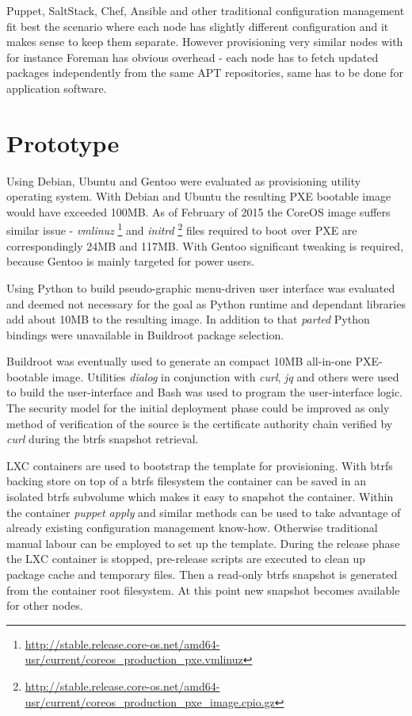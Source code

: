 \documentclass{article}
\begin{document}
Puppet, SaltStack, Chef, Ansible and other traditional configuration management
fit best the scenario where each node has slightly different configuration and
it makes sense to keep them separate. However provisioning very similar nodes
with for instance Foreman has obvious overhead - each node has to fetch updated
packages independently from the same APT repositories, same has to be done for
application software.

\section{Prototype}

Using Debian, Ubuntu and Gentoo were evaluated as provisioning utility
operating system. With Debian and Ubuntu the resulting PXE bootable image
would have exceeded 100MB.
As of February of 2015 the CoreOS image suffers similar issue -
\emph{vmlinuz}
\footnote{\url{http://stable.release.core-os.net/amd64-usr/current/coreos_production_pxe.vmlinuz}}
and
\emph{initrd}
\footnote{\url{http://stable.release.core-os.net/amd64-usr/current/coreos_production_pxe_image.cpio.gz}}
files required to boot over PXE are correspondingly 24MB and 117MB.
With Gentoo significant tweaking is required, because Gentoo is
mainly targeted for power users.

Using Python to build pseudo-graphic menu-driven user interface was
evaluated and deemed not necessary for the goal as Python runtime and
dependant libraries add about 10MB to the resulting image.
In addition to that \emph{parted} Python bindings were unavailable
in Buildroot package selection.

Buildroot was eventually used to generate an compact 10MB all-in-one
PXE-bootable image. Utilities \emph{dialog} in conjunction with
\emph{curl}, \emph{jq} and others were used to build the user-interface
and Bash was used to program the user-interface logic.
The security model for the initial deployment phase could be improved
as only method of verification of the source is the certificate
authority chain verified by \emph{curl} during the btrfs snapshot
retrieval.

LXC containers are used to bootstrap the template for provisioning.
With btrfs backing store on top of a btrfs filesystem the container
can be saved in an isolated btrfs subvolume which makes it easy to
snapshot the container.
Within the container \emph{puppet apply} and similar methods can be used
to take advantage of already existing configuration management know-how.
Otherwise traditional manual labour can be employed to set up the template.
During the release phase the LXC container is stopped, pre-release scripts
are executed to clean up package cache and temporary files.
Then a read-only btrfs snapshot is generated from the container root filesystem.
At this point new snapshot becomes available for other nodes.
\end{document}
